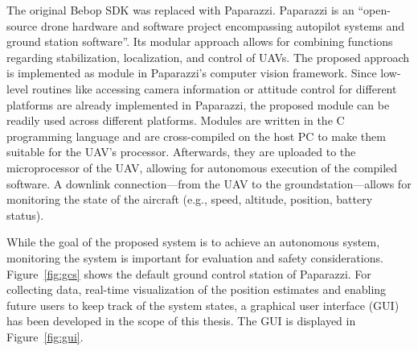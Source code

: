The original Bebop SDK was replaced with Paparazzi. Paparazzi is an
``open-source drone hardware and software project encompassing
autopilot systems and ground station software''. Its modular approach
allows for combining functions regarding stabilization, localization,
and control of UAVs.
The proposed approach is implemented as module in Paparazzi's computer
vision framework. Since low-level routines like accessing camera
information or attitude control for different platforms are already
implemented in Paparazzi, the proposed module can be readily used
across different platforms. Modules are written in the C programming
language and are cross-compiled on the host PC to make them suitable
for the UAV's processor. Afterwards, they are uploaded to the
microprocessor of the UAV, allowing for autonomous execution of the
compiled software. A downlink connection---from the UAV to the
groundstation---allows for monitoring the state of the aircraft (e.g.,
speed, altitude, position, battery status).

While the goal of the proposed system is to achieve an autonomous
system, monitoring the system is important for evaluation and safety
considerations. Figure~\ref{fig:gcs} shows the default ground control
station of Paparazzi.
For collecting data, real-time visualization of the position estimates
and enabling future users to keep track of the system states, a
graphical user interface (GUI) has been developed in the scope of this
thesis. The GUI is displayed in Figure~\ref{fig:gui}.


